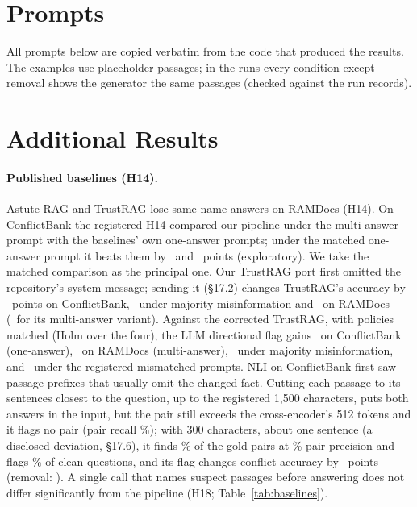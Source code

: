 \section{Prompts}
\label{app:prompts}
All prompts below are copied verbatim from the code that produced the results. The examples use placeholder passages; in the runs every condition except removal shows the generator the same passages (checked against the run records).


\section{Additional Results}
\label{app:extra}

\paragraph{Published baselines (H14).} Astute RAG \citep{wang2025astute} and TrustRAG \citep{zhou2025trustrag} lose same-name answers
on RAMDocs (H14). On ConflictBank the registered H14 compared our pipeline under the multi-answer prompt with the
baselines' own one-answer prompts; under the matched one-answer prompt it beats them by \hFourteenMatchedAst\ and
\hFourteenMatchedTr\ points (exploratory). We take the matched comparison as the principal one. Our TrustRAG port
first omitted the repository's system message; sending it (\S17.2) changes TrustRAG's accuracy by \blTrustSysCb\
points on ConflictBank, \blTrustSysMj\ under majority misinformation and \blTrustSysRd\ on RAMDocs (\blTrustSysRdMulti\
for its multi-answer variant). Against the corrected TrustRAG, with policies matched (Holm over the four), the LLM
directional flag gains \blHFourteenCbs\ on ConflictBank (one-answer), \blHFourteenRd\ on RAMDocs (multi-answer),
\blHFourteenMj\ under majority misinformation, and \blHFourteenCb\ under the registered mismatched prompts.
NLI on ConflictBank first saw passage prefixes that usually omit the changed fact. Cutting each passage to its
sentences closest to the question, up to the registered 1,500 characters, puts both answers in the input, but the
pair still exceeds the cross-encoder's 512 tokens and it flags no pair (pair recall \detNliWinRecall\%); with
300 characters, about one sentence (a disclosed deviation, \S17.6), it finds \detNliSentRecall\% of the gold pairs at
\detNliSentPrec\% pair precision and flags \detNliSentCleanFpr\% of clean questions, and its flag changes conflict
accuracy by \blNliSentFlag\ points (removal: \blNliSentRem). A single call that names suspect passages before
answering does not differ significantly from the pipeline (H18; Table~\ref{tab:baselines}).

